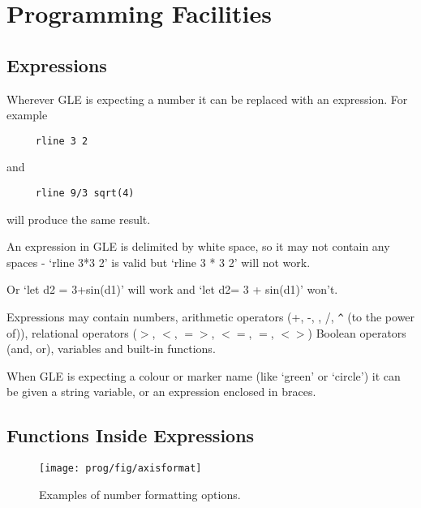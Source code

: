 \chapter{Programming Facilities}

\section{Expressions}
Wherever GLE is expecting a number it can be replaced with an expression.  For
example

\preglecode{}
\begin{Verbatim}
     rline 3 2
\end{Verbatim}
\postglecode{}

and

\preglecode{}
\begin{Verbatim}
     rline 9/3 sqrt(4)
\end{Verbatim}
\postglecode{}

will produce the same result.

An expression in GLE is delimited by white space, so it may not contain any
spaces - `{\sf rline 3*3 2}' is valid but `{\sf rline 3 * 3 2}' will not work.

Or `{\sf let d2 = 3+sin(d1)}' will work and `{\sf let d2= 3 + sin(d1)}' won't.

Expressions may contain numbers, arithmetic operators ({\sf +}, {\sf -}, {\sf *},
{\sf /}, \verb+^+ (to the power of)), relational operators ($>$, $<$, $=>$, $<=$,
$=$, $<>$) Boolean operators ({\sf and}, {\sf or}), variables and built-in functions.

When GLE is expecting a colour or marker name (like `green' or `circle')
it can be given a string variable, or an expression enclosed in braces.

\section{Functions Inside Expressions}

\begin{figure}[tb]
\centering
\mbox{\texttt{[image: prog/fig/axisformat]}}
\caption{\label{axformat:fig}Examples of number formatting options.}
\end{figure}


